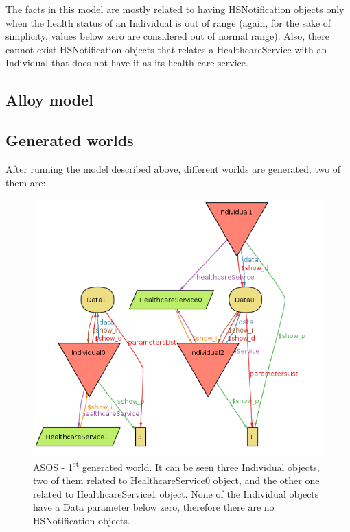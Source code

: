 \documentclass[a4paper, hidelinks, 12pt]{report}
\begin{document}
	The facts in this model are mostly related to having HSNotification objects only when the health status of an Individual is out of range (again, for the sake of simplicity, values below zero are considered out of normal range). Also, there cannot exist HSNotification objects that relates a HealthcareService with an Individual that does not have it as its health-care service.
	
	\subsection{Alloy model}
	\vspace{2 mm}
	
	
	
	\vspace{8 mm}
	
	\subsection{Generated worlds}
	After running the model described above, different worlds are generated, two of them are:
	
	\begin{figure}[H]
		\centering
		\includegraphics[scale=0.55]{Diagrams/goal_5_world_1.png}
		\caption[ASOS - First generated world]{ASOS - 1\textsuperscript{st} generated world. It can be seen three Individual objects, two of them related to HealthcareService0 object, and the other one related to HealthcareService1 object. None of the Individual objects have a Data parameter below zero, therefore there are no HSNotification objects.}
		\label{fig:goal_5_world_1}
	\end{figure}
	
\end{document}
